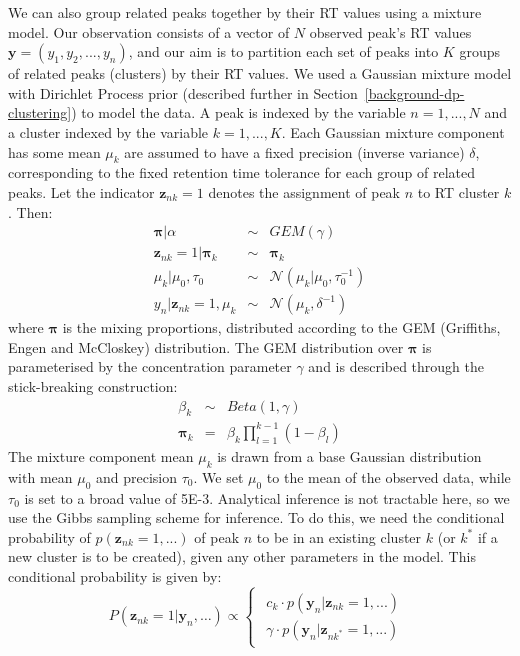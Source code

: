 We can also group related peaks together by their RT values using a mixture model. Our observation consists of a vector of $N$ observed peak's RT values $\mathbf{y}=(y_{1},y_{2},...,y_{n})$, and our aim is to partition each set of peaks into $K$ groups of related peaks (clusters) by their RT values. We used a Gaussian mixture model with Dirichlet Process prior (described further in Section~\ref{background-dp-clustering}) to model the data. A peak is indexed by the variable $n=1,...,N$ and a cluster indexed by the variable $k=1,...,K$. Each Gaussian mixture component has some mean $\mu_{k}$ are assumed to have a fixed precision (inverse variance) $\delta$, corresponding to the fixed retention time tolerance for each group of related peaks. Let the indicator $\boldsymbol{z}_{nk}=1$ denotes the assignment of peak $n$ to RT cluster $k$. Then: 
\begin{eqnarray}
\boldsymbol{\pi}|\alpha & \sim & GEM(\gamma)\\
\boldsymbol{z}_{nk}=1|\boldsymbol{\pi}_{k} & \sim & \boldsymbol{\pi}_{k}\\
\mu_{k}|\mu_{0},\tau_{0} & \sim & \mathcal{N}(\mu_{k}|\mu_{0},\tau_{0}^{-1})\\
y_{n}|\boldsymbol{z}_{nk}=1,\mu_{k} & \sim & \mathcal{N}(\mu_{k},\delta^{-1})
\end{eqnarray}
where $\boldsymbol{\pi}$ is the mixing proportions, distributed according to the GEM (Griffiths, Engen and McCloskey) distribution. The GEM distribution over $\boldsymbol{\pi}$ is parameterised by the concentration parameter $\gamma$ and is described through the stick-breaking construction:
\begin{eqnarray}
\beta_{k} & \sim & Beta(1,\gamma)\\
\boldsymbol{\pi}_{k} & = & \beta_{k}\prod_{l=1}^{k-1}(1-\beta_{l})
\end{eqnarray}
The mixture component mean $\mu_{k}$ is drawn from a base Gaussian distribution with mean $\mu_{0}$ and precision $\tau_{0}$. We set $\mu_{0}$ to the mean of the observed data, while $\tau_{0}$ is set to a broad value of 5E-3. Analytical inference is not tractable here, so we use the Gibbs sampling scheme for inference. To do this, we need the conditional probability of $p(\boldsymbol{z}_{nk}=1,...)$ of peak $n$ to be in an existing cluster $k$ (or $k^{*}$ if a new cluster is to be created), given any other parameters in the model. This conditional probability is given by:
\begin{equation}
P(\boldsymbol{z}_{nk}=1|\mathbf{y}_{n},\ldots)\propto\begin{cases}
\begin{array}{c}
c_{k}\cdot p(\mathbf{y}_{n}|\boldsymbol{z}_{nk}=1,...)\\
\gamma\cdot p(\mathbf{y}_{n}|\boldsymbol{z}_{nk^{*}}=1,...)
\end{array}\end{cases}\label{eq:table_likelihood}
\end{equation}
